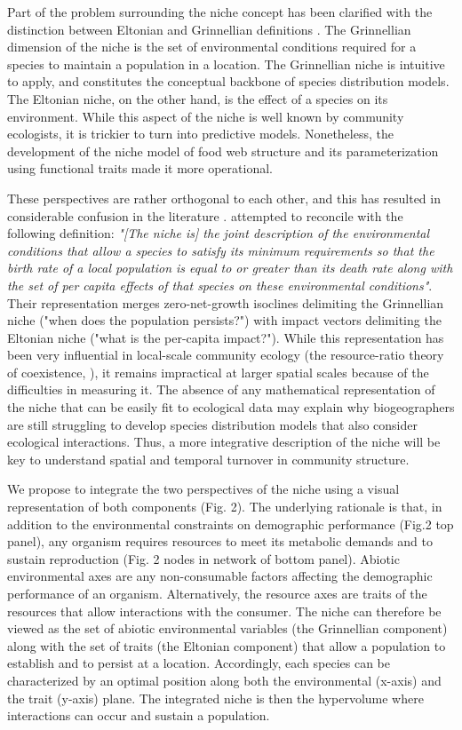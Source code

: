 \documentclass[12pt]{article}
\begin{document}
Part of the problem surrounding the niche concept has been clarified with the
distinction between Eltonian and Grinnellian definitions \citep{Chase2003}.
The Grinnellian dimension of the niche is the set of environmental conditions
required for a species to maintain a population in a location. The Grinnellian
niche is intuitive to apply, and constitutes the conceptual backbone of
species distribution models. The Eltonian niche, on the other hand, is the
effect of a species on its environment. While this aspect of the niche is well
known by community ecologists, it is trickier to turn into predictive models.
Nonetheless, the development of the niche model of food web structure
\citep{Williams2000a} and its parameterization using functional traits
\citep{Gravel2013, Bartomeus2016} made it more operational.

These perspectives are rather orthogonal to each other, and this has resulted
in considerable confusion in the literature \citep{McInerny2012a}.
\citealt{Chase2003} attempted to reconcile with the following definition:
\emph{"[The niche is] the joint description of the environmental conditions that
allow a species to satisfy its minimum requirements so that the birth rate of
a local population is equal to or greater than its death rate along with the
set of per capita effects of that species on these environmental conditions"}.
Their representation merges zero-net-growth isoclines delimiting the
Grinnellian niche ("when does the population persists?") with impact vectors
delimiting the Eltonian niche ("what is the per-capita impact?"). While this
representation has been very influential in local-scale community ecology (the
resource-ratio theory of coexistence, \citealt{Tilman1982}), it remains
impractical at larger spatial scales because of the difficulties in measuring
it. The absence of any mathematical representation of the niche that can be
easily fit to ecological data may explain why biogeographers are still
struggling to develop species distribution models that also consider
ecological interactions. Thus, a more integrative description of the niche
will be key to understand spatial and temporal turnover in community
structure.

We propose to integrate the two perspectives of the niche using a visual
representation of both components (Fig. 2). The underlying rationale is that,
in addition to the environmental constraints on demographic performance (Fig.2
top panel), any organism requires resources to meet its metabolic demands and
to sustain reproduction (Fig. 2 nodes in network of bottom panel). Abiotic
environmental axes are any non-consumable factors affecting the demographic
performance of an organism. Alternatively, the resource axes are traits of the
resources that allow interactions with the consumer. The niche can therefore
be viewed as the set of abiotic environmental variables (the Grinnellian
component) along with the set of traits (the Eltonian component) that allow a
population to establish and to persist at a location. Accordingly, each
species can be characterized by an optimal position along both the
environmental (x-axis) and the trait (y-axis) plane. The integrated niche is
then the hypervolume where interactions can occur and sustain a population.
\end{document}

